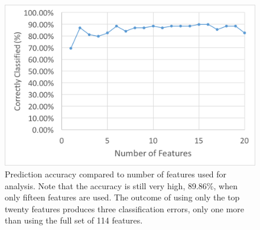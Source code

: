 \documentclass[12pt]{report}
\begin{document}
\begin{figure}[t]
    \centering
        \includegraphics[width=.8\columnwidth,trim={0mm 0mm 0mm 0mm},clip]{FeatureAnalysis}
        \vspace{-7pt}
        \caption[Prediction accuracy compared to number of features]{Prediction accuracy compared to number of features used for analysis.  Note that the accuracy is still very high, 89.86\%, when only fifteen features are used.  The outcome of using only the top twenty features produces three classification errors, only one more than using the full set of 114 features. }
        \label{fig:feat_analysis}
\end{figure}
\end{document}
